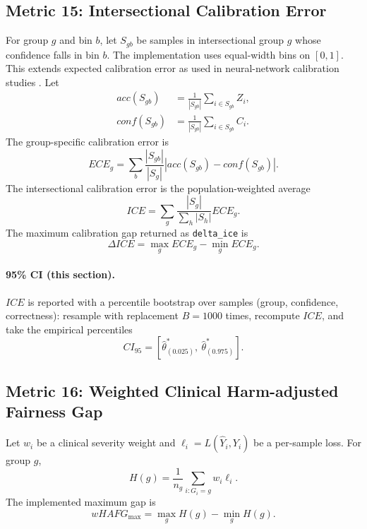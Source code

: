 \documentclass[11pt]{article}
\begin{document}
\subsection{Metric 15: Intersectional Calibration Error}

For group $g$ and bin $b$, let $S_{gb}$ be samples in intersectional group $g$
whose confidence falls in bin $b$. The implementation uses equal-width bins on
$[0,1]$. This extends expected calibration error as used in neural-network
calibration studies \cite{guo2017}. Let
\begin{align}
acc(S_{gb}) &= \frac{1}{|S_{gb}|}\sum_{i\in S_{gb}}Z_i,\\
conf(S_{gb}) &= \frac{1}{|S_{gb}|}\sum_{i\in S_{gb}}C_i.
\end{align}
The group-specific calibration error is
\begin{equation}
ECE_g = \sum_b \frac{|S_{gb}|}{|S_g|}
\left|acc(S_{gb})-conf(S_{gb})\right|.
\end{equation}
The intersectional calibration error is the population-weighted average
\begin{equation}
ICE = \sum_g \frac{|S_g|}{\sum_h |S_h|}ECE_g.
\end{equation}
The maximum calibration gap returned as \texttt{delta\_ice} is
\begin{equation}
\Delta ICE = \max_g ECE_g-\min_g ECE_g.
\end{equation}


\paragraph{95\% CI (this section).} $ICE$ is reported with a percentile bootstrap over samples (group, confidence, correctness): resample with replacement $B=1000$ times, recompute $ICE$, and take the empirical percentiles
\begin{equation}
CI_{95}=\left[\hat\theta^{\ast}_{(0.025)},\ \hat\theta^{\ast}_{(0.975)}\right].
\end{equation}

\subsection{Metric 16: Weighted Clinical Harm-adjusted Fairness Gap}

Let $w_i$ be a clinical severity weight and $\ell_i=L(\hat Y_i,Y_i)$ be a
per-sample loss. For group $g$,
\begin{equation}
H(g)=\frac{1}{n_g}\sum_{i:G_i=g}w_i\ell_i.
\end{equation}
The implemented maximum gap is
\begin{equation}
wHAFG_{\max}=\max_g H(g)-\min_g H(g).
\end{equation}
\end{document}
